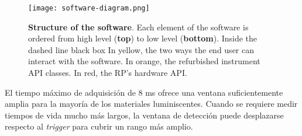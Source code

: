\begin{figure}[h]
     \centering
     \caption{\textbf{Structure of the software}. Each element of the software is ordered from high level (\textbf{top}) to low level (\textbf{bottom}). Inside the dashed line black box In yellow, the two ways the end user can interact with the software. In orange, the refurbished instrument API classes. In red, the RP's hardware API.}
     \texttt{[image: software-diagram.png]}
     \label{fig:code}
\end{figure}


El tiempo máximo de adquisición de 8 ms ofrece una ventana suficientemente amplia para la mayoría de los materiales luminiscentes. Cuando se requiere medir tiempos de vida mucho más largos, la ventana de detección puede desplazarse respecto al \textit{trigger} para cubrir un rango más amplio. 

